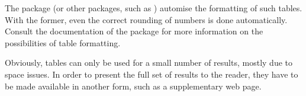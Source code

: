The  package (or other packages, such as )
automise the formatting of such tables.  With the former, even the correct
rounding of numbers is done automatically.  Consult the documentation of the
 package for more information on the possibilities of table
formatting.

Obviously, tables can only be used for a small number of results, mostly due to
space issues.  In order to present the full set of results to the reader, they
have to be made available in another form, such as a supplementary web page.
